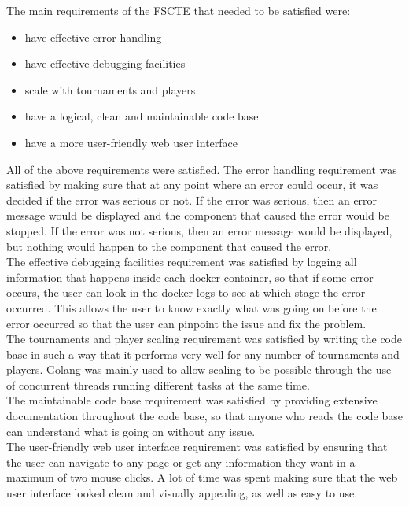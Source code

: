 \documentclass[a4paper, 11pt]{report}
\begin{document}
The main requirements of the FSCTE that needed to be satisfied were:
\begin{itemize}
	\item have effective error handling
	\item have effective debugging facilities
	\item scale with tournaments and players
	\item have a logical, clean and maintainable code base
	\item have a more user-friendly web user interface
\end{itemize}
All of the above requirements were satisfied. The error handling requirement
was satisfied by making sure that at any point where an error could occur, it
was decided if the error was serious or not. If the error was serious, then an
error message would be displayed and the component that caused the error would
be stopped. If the error was not serious, then an error message would be displayed,
but nothing would happen to the component that caused the error. \\

The effective debugging facilities requirement was satisfied by logging all
information that happens inside each docker container, so that if some error
occurs, the user can look in the docker logs to see at which stage the error
occurred. This allows the user to know exactly what was going on before the
error occurred so that the user can pinpoint the issue and fix the problem. \\

The tournaments and player scaling requirement was satisfied by writing the
code base in such a way that it performs very well for any number of tournaments
and players. Golang was mainly used to allow scaling to be possible through the
use of concurrent threads running different tasks at the same time. \\

The maintainable code base requirement was satisfied by providing extensive
documentation throughout the code base, so that anyone who reads the code base
can understand what is going on without any issue. \\

The user-friendly web user interface requirement was satisfied by ensuring that
the user can navigate to any page or get any information they want in a maximum
of two mouse clicks. A lot of time was spent making sure that the web user
interface looked clean and visually appealing, as well as easy to use. \\
\end{document}

